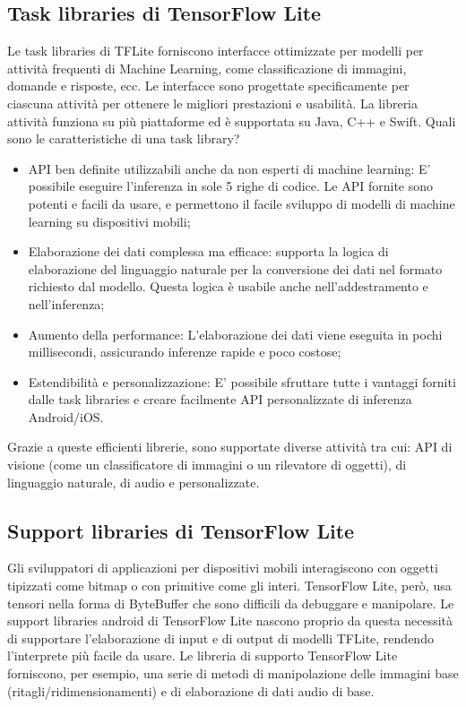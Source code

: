 \subsection{Task libraries di TensorFlow Lite}
Le task libraries di TFLite forniscono interfacce ottimizzate per modelli per attività frequenti di Machine Learning, come classificazione di immagini,
domande e risposte, ecc. Le interfacce sono progettate specificamente per ciascuna attività per ottenere le migliori prestazioni e usabilità. La libreria
attività funziona su più piattaforme ed è supportata su Java, C++ e Swift.
Quali sono le caratteristiche di una task library?
\begin{itemize}
    \item API ben definite utilizzabili anche da non esperti di machine learning: E’ possibile eseguire l’inferenza in sole 5 righe di codice. Le API
    fornite sono potenti e facili da usare, e permettono il facile sviluppo di modelli di machine learning su dispositivi mobili;
    \item Elaborazione dei dati complessa ma efficace: supporta la logica di elaborazione del linguaggio naturale per la conversione dei dati nel
    formato richiesto dal modello. Questa logica è usabile anche nell’addestramento e nell’inferenza;
    \item Aumento della performance: L’elaborazione dei dati viene eseguita in pochi millisecondi, assicurando inferenze rapide e poco costose;
    \item Estendibilità e personalizzazione: E’ possibile sfruttare tutte i vantaggi forniti dalle task libraries e creare facilmente API personalizzate
    di inferenza Android/iOS.
\end{itemize}

Grazie a queste efficienti librerie, sono supportate diverse attività tra cui: API di visione (come un classificatore di immagini o un rilevatore di
oggetti), di linguaggio naturale, di audio e personalizzate.

\subsection{Support libraries di TensorFlow Lite}
Gli sviluppatori di applicazioni per dispositivi mobili interagiscono con oggetti tipizzati come bitmap o con primitive come gli interi. TensorFlow Lite,
però, usa tensori nella forma di ByteBuffer che sono difficili da debuggare e manipolare. Le support libraries android di TensorFlow Lite nascono proprio
da questa necessità di supportare l’elaborazione di input e di output di modelli TFLite, rendendo l’interprete più facile da usare.
Le libreria di supporto TensorFlow Lite forniscono, per esempio, una serie di metodi di manipolazione delle immagini base (ritagli/ridimensionamenti) e
di elaborazione di dati audio di base.
